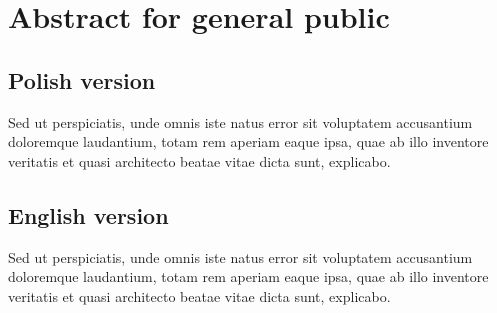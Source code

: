 \section{Abstract for general public}


\subsection{Polish version}

Sed ut perspiciatis, unde omnis iste natus error sit voluptatem accusantium doloremque laudantium, totam rem aperiam eaque ipsa, quae ab illo inventore veritatis et quasi architecto beatae vitae dicta sunt, explicabo.

\subsection{English version}

Sed ut perspiciatis, unde omnis iste natus error sit voluptatem accusantium doloremque laudantium, totam rem aperiam eaque ipsa, quae ab illo inventore veritatis et quasi architecto beatae vitae dicta sunt, explicabo.
